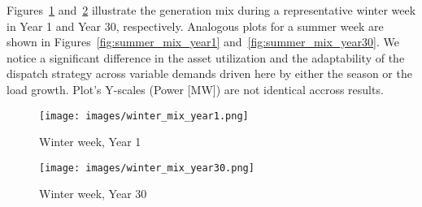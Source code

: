 
Figures~\ref{fig:winter_mix_year1} and~\ref{fig:winter_mix_year30} illustrate the 
generation mix during a representative winter week in Year 1 and Year 30, respectively. 
Analogous plots for a summer week are shown in Figures~\ref{fig:summer_mix_year1} 
and~\ref{fig:summer_mix_year30}. We notice a significant difference in the asset utilization 
and the adaptability of the dispatch strategy across variable demands driven here by either 
the season or the load growth. Plot's Y-scales (Power [MW]) are not identical accross results.

\newpage
\begin{figure}[h!]
    \centering
        \centering
        \texttt{[image: images/winter\_mix\_year1.png]}
        \caption{Winter week, Year 1}
        \label{fig:winter_mix_year1}
\end{figure}
\begin{figure}[h!]
    \centering
        \centering
        \texttt{[image: images/winter\_mix\_year30.png]}
        \caption{Winter week, Year 30 }
        \label{fig:winter_mix_year30}
\end{figure}

